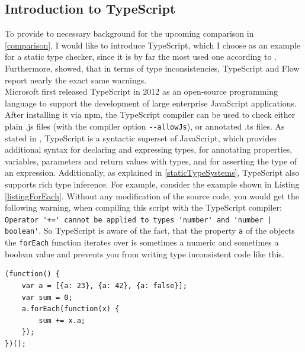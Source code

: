 \documentclass[runningheads,a4paper]{llncs}
\begin{document}
\subsection{Introduction to TypeScript} \label{IntroToTS}
To provide to necessary background for the upcoming comparison in \ref{comparison}, I would like to introduce TypeScript, which I choose as an example for a static type checker, since it is by far the most used one according to \cite{StateOfJs}.
Furthermore, \cite{DBLP:conf/icse/GaoBB17} showed, that in terms of type inconsistencies, TypeScript and Flow report nearly the exact same warnings.\\
Microsoft first released TypeScript in 2012 as an open-source programming language to support the development of large enterprise JavaScript applications. 
After installing it via npm, the TypeScript compiler can be used to check either plain .js files (with the compiler option  \lstinline[columns=fixed]{--allowJs}), or annotated .ts files.
As stated in \cite{DBLP:conf/ecoop/BiermanAT14}, TypeScript is a syntactic superset of JavaScript, which provides additional syntax for declaring and expressing types, for annotating properties, variables, parameters and return values with types, and for asserting the type of an expression.
Additionally, as explained in \ref{staticTypeSystems}, TypeScript also supports rich type inference.
For example, consider the example shown in Listing \ref{listingForEach}.
Without any modification of the source code, you would get the following warning, when compiling this script with the TypeScript compiler:
\lstinline[columns=fixed]{Operator '+=' cannot be applied to types 'number' and 'number | boolean'}.
So TypeScript is aware of the fact, that the property \lstinline[columns=fixed]{a} of the objects the \lstinline[columns=fixed]{forEach} function iterates over is sometimes a numeric and sometimes a boolean value and prevents you from writing type inconsistent code like this.

\medskip\medskip
\lstset{language=javascript}
\begin{minipage}{\linewidth}
\begin{lstlisting}[frame=single, caption=Inconsistent ForEach, label=listingForEach]
(function() {
    var a = [{a: 23}, {a: 42}, {a: false}];
    var sum = 0;
    a.forEach(function(x) {
        sum += x.a;
    });
})();
\end{lstlisting}
\end{minipage}
\end{document}
